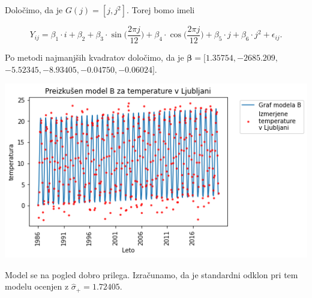 \documentclass[12pt, a4paper]{article}
\begin{document}
Določimo, da je $G(j) = [j, j^2]$. Torej bomo imeli

$$ Y_{ij} = \beta_1 \cdot i + \beta_2 + \beta_3 \cdot \sin \Big(\frac{2\pi j}{12}\Big)
+ \beta_4 \cdot \cos \Big(\frac{2\pi j}{12}\Big) + \beta_5 \cdot j + \beta_6 \cdot j^2 
+ \epsilon_{ij} \text{.}
$$

Po metodi najmanjših kvadratov določimo, da je $\boldsymbol{\beta} = [1.35754, 
-2685.209, $ $-5.52345, -8.93405, -0.04750, -0.06024]$. 

\begin{center}
    \includegraphics[scale=0.5]{Naloga_3_08}
\end{center}

Model se na pogled dobro prilega. Izračunamo, da je standardni odklon pri tem 
modelu ocenjen z $\hat{\sigma}_+ = 1.72405$. 

\begin{figure}[h]
\end{figure}
\end{document}
